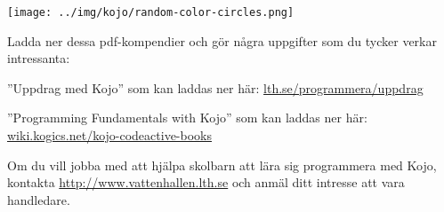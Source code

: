 \texttt{[image: ../img/kojo/random-color-circles.png]}


\Task Ladda ner dessa pdf-kompendier och gör några uppgifter som du tycker verkar intressanta:

\Subtask ''Uppdrag med Kojo'' som kan laddas ner här: \href{http://lth.se/programmera/uppdrag}{lth.se/programmera/uppdrag}

\Subtask ''Programming Fundamentals with Kojo'' som kan laddas ner här:\\
 \href{http://wiki.kogics.net/kojo-codeactive-books}{wiki.kogics.net/kojo-codeactive-books}
 
\Task Om du vill jobba med att hjälpa skolbarn att lära sig programmera med Kojo, kontakta \url{http://www.vattenhallen.lth.se} och anmäl ditt intresse att vara handledare. 
